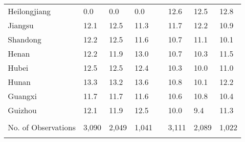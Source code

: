 \begin{tabular}{l p{1cm} p{1cm} p{1cm} c p{1cm} p{1cm} p{1cm}}
\hspace{.6cm} Heilongjiang & 0.0        & 0.0        & 0.0        & & 12.6       & 12.5       & 12.8       \\
\hspace{.6cm} Jiangsu & 12.1       & 12.5       & 11.3       & & 11.7       & 12.2       & 10.9       \\
\hspace{.6cm} Shandong & 12.2       & 12.5       & 11.6       & & 10.7       & 11.1       & 10.1       \\
\hspace{.6cm} Henan & 12.2       & 11.9       & 13.0       & & 10.7       & 10.3       & 11.5       \\
\hspace{.6cm} Hubei & 12.5       & 12.5       & 12.4       & & 10.3       & 10.0       & 11.0       \\
\hspace{.6cm} Hunan & 13.3       & 13.2       & 13.6       & & 10.8       & 10.1       & 12.2       \\
\hspace{.6cm} Guangxi & 11.7       & 11.7       & 11.6       & & 10.6       & 10.8       & 10.4       \\
\hspace{.6cm} Guizhou & 12.1       & 11.9       & 12.5       & & 10.0       & 9.4        & 11.3       \\
\\ No. of Observations  & 3,090      & 2,049      & 1,041      & & 3,111      & 2,089      & 1,022      \\  \\
\bottomrule
\end{tabular}
